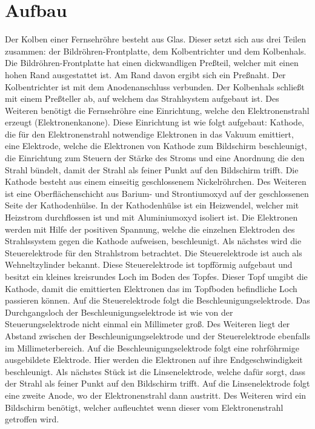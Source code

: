 \section{Aufbau}
Der Kolben einer Fernsehröhre besteht aus Glas.
Dieser setzt sich aus drei Teilen zusammen: der Bildröhren-Frontplatte, dem Kolbentrichter und dem Kolbenhals.
Die Bildröhren-Frontplatte hat einen dickwandligen Preßteil, welcher mit einen hohen Rand ausgestattet ist.
Am Rand davon ergibt sich ein Preßnaht.
Der Kolbentrichter ist mit dem Anodenanschluss verbunden.
Der Kolbenhals schließt mit einem Preßteller ab, auf welchem das Strahlsystem aufgebaut ist.
Des Weiteren benötigt die Fernsehröhre eine Einrichtung, welche den Elektronenstrahl erzeugt (Elektronenkanone).
Diese Einrichtung ist wie folgt aufgebaut: Kathode, die für den Elektronenstrahl notwendige Elektronen in das Vakuum emittiert, eine Elektrode, welche die Elektronen von Kathode zum Bildschirm beschleunigt, die Einrichtung zum Steuern der Stärke des Stroms und eine Anordnung die den Strahl bündelt, damit der Strahl als feiner Punkt auf den Bildschirm trifft. 
Die Kathode besteht aus einem einseitig geschlossenem Nickelröhrchen.
Des Weiteren ist eine Oberflächenschicht aus Barium- und Strontiumoxyd auf der geschlossenen Seite der Kathodenhülse.
In der Kathodenhülse ist ein Heizwendel, welcher mit Heizstrom durchflossen ist und mit Aluminiumoxyd isoliert ist.
Die Elektronen werden mit Hilfe der positiven Spannung, welche die einzelnen Elektroden des Strahlssystem gegen die Kathode aufweisen, beschleunigt.
Als nächstes wird die Steuerelektrode für den Strahlstrom betrachtet.
Die Steuerelektrode ist auch als Wehneltzylinder bekannt.
Diese Steuerelektrode ist topfförmig aufgebaut und besitzt ein kleines kreisrundes Loch im Boden des Topfes.
Dieser Topf umgibt die Kathode, damit die emittierten Elektronen das im Topfboden befindliche Loch passieren können.
Auf die Steuerelektrode folgt die Beschleunigungselektrode.
Das Durchgangsloch der Beschleunigungselektrode ist wie von der Steuerungselektrode nicht einmal ein Millimeter groß.
Des Weiteren liegt der Abstand zwischen der Beschleunigungselektrode und der Steuerelektrode ebenfalls im Millimeterbereich.
Auf die Beschleunigungselektrode folgt eine rohrföhrmige ausgebildete Elektrode.
Hier werden die Elektronen auf ihre Endgeschwindigkeit beschleunigt.
Als nächstes Stück ist die Linsenelektrode, welche dafür sorgt, dass der Strahl als feiner Punkt auf den Bildschirm trifft.
Auf die Linsenelektrode folgt eine zweite Anode, wo der Elektronenstrahl dann austritt.
Des Weiteren wird ein Bildschirm benötigt, welcher aufleuchtet wenn dieser vom Elektronenstrahl getroffen wird.
